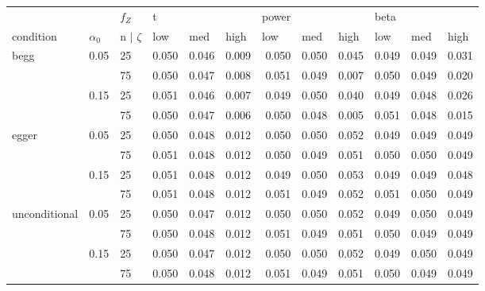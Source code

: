 \begin{tabular}{lll |rrrrrrrrr}
  \hline
               &             & $f_Z$               & \multicolumn{1}{l}{     t} & \multicolumn{1}{l}{      } & \multicolumn{1}{l}{      } & \multicolumn{1}{l}{ power} & \multicolumn{1}{l}{      } & \multicolumn{1}{l}{      } & \multicolumn{1}{l}{  beta} & \multicolumn{1}{l}{      } & \multicolumn{1}{l}{      } \\ 
  condition     & $\alpha_0$ & n $\vert$ $\zeta$ & \multicolumn{1}{l}{   low} & \multicolumn{1}{l}{   med} & \multicolumn{1}{l}{  high} & \multicolumn{1}{l}{   low} & \multicolumn{1}{l}{   med} & \multicolumn{1}{l}{  high} & \multicolumn{1}{l}{   low} & \multicolumn{1}{l}{   med} & \multicolumn{1}{l}{  high} \\ 
   \hline
begg          & 0.05        & 25                  & 0.050 & 0.046 & 0.009 & 0.050 & 0.050 & 0.045 & 0.049 & 0.049 & 0.031 \\ 
                &             & 75                  & 0.050 & 0.047 & 0.008 & 0.051 & 0.049 & 0.007 & 0.050 & 0.049 & 0.020 \\ 
                & 0.15        & 25                  & 0.051 & 0.046 & 0.007 & 0.049 & 0.050 & 0.040 & 0.049 & 0.048 & 0.026 \\ 
                &             & 75                  & 0.050 & 0.047 & 0.006 & 0.050 & 0.048 & 0.005 & 0.051 & 0.048 & 0.015 \\ 
  egger         & 0.05        & 25                  & 0.050 & 0.048 & 0.012 & 0.050 & 0.050 & 0.052 & 0.049 & 0.049 & 0.049 \\ 
                &             & 75                  & 0.051 & 0.048 & 0.012 & 0.050 & 0.049 & 0.051 & 0.050 & 0.050 & 0.049 \\ 
                & 0.15        & 25                  & 0.051 & 0.048 & 0.012 & 0.049 & 0.050 & 0.053 & 0.049 & 0.049 & 0.048 \\ 
                &             & 75                  & 0.051 & 0.048 & 0.012 & 0.051 & 0.049 & 0.052 & 0.051 & 0.050 & 0.049 \\ 
  unconditional & 0.05        & 25                  & 0.050 & 0.047 & 0.012 & 0.050 & 0.050 & 0.052 & 0.049 & 0.050 & 0.049 \\ 
                &             & 75                  & 0.050 & 0.048 & 0.012 & 0.051 & 0.049 & 0.051 & 0.050 & 0.049 & 0.049 \\ 
                & 0.15        & 25                  & 0.050 & 0.047 & 0.012 & 0.050 & 0.050 & 0.052 & 0.049 & 0.050 & 0.049 \\ 
                &             & 75                  & 0.050 & 0.048 & 0.012 & 0.051 & 0.049 & 0.051 & 0.050 & 0.049 & 0.049 \\ 
   \hline
\end{tabular}
